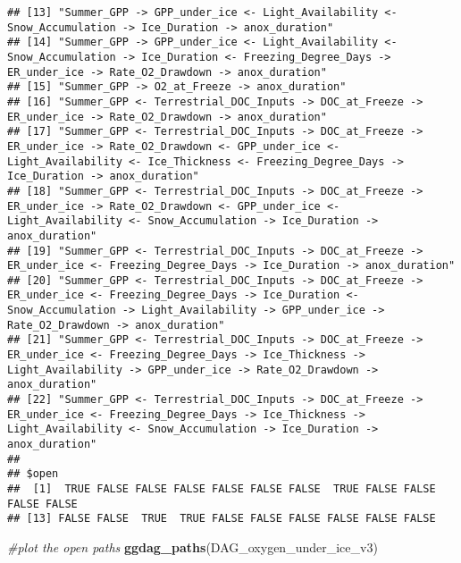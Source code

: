 \documentclass[
]{article}
\newenvironment{Shaded}{\begin{snugshade}}{\end{snugshade}}
\newcommand{\CommentTok}[1]{\textcolor[rgb]{0.56,0.35,0.01}{\textit{#1}}}
\newcommand{\FunctionTok}[1]{\textcolor[rgb]{0.13,0.29,0.53}{\textbf{#1}}}
\newcommand{\NormalTok}[1]{#1}
\begin{document}
\begin{verbatim}
## [13] "Summer_GPP -> GPP_under_ice <- Light_Availability <- Snow_Accumulation -> Ice_Duration -> anox_duration"                                                                                                       
## [14] "Summer_GPP -> GPP_under_ice <- Light_Availability <- Snow_Accumulation -> Ice_Duration <- Freezing_Degree_Days -> ER_under_ice -> Rate_O2_Drawdown -> anox_duration"                                           
## [15] "Summer_GPP -> O2_at_Freeze -> anox_duration"                                                                                                                                                                   
## [16] "Summer_GPP <- Terrestrial_DOC_Inputs -> DOC_at_Freeze -> ER_under_ice -> Rate_O2_Drawdown -> anox_duration"                                                                                                    
## [17] "Summer_GPP <- Terrestrial_DOC_Inputs -> DOC_at_Freeze -> ER_under_ice -> Rate_O2_Drawdown <- GPP_under_ice <- Light_Availability <- Ice_Thickness <- Freezing_Degree_Days -> Ice_Duration -> anox_duration"    
## [18] "Summer_GPP <- Terrestrial_DOC_Inputs -> DOC_at_Freeze -> ER_under_ice -> Rate_O2_Drawdown <- GPP_under_ice <- Light_Availability <- Snow_Accumulation -> Ice_Duration -> anox_duration"                        
## [19] "Summer_GPP <- Terrestrial_DOC_Inputs -> DOC_at_Freeze -> ER_under_ice <- Freezing_Degree_Days -> Ice_Duration -> anox_duration"                                                                                
## [20] "Summer_GPP <- Terrestrial_DOC_Inputs -> DOC_at_Freeze -> ER_under_ice <- Freezing_Degree_Days -> Ice_Duration <- Snow_Accumulation -> Light_Availability -> GPP_under_ice -> Rate_O2_Drawdown -> anox_duration"
## [21] "Summer_GPP <- Terrestrial_DOC_Inputs -> DOC_at_Freeze -> ER_under_ice <- Freezing_Degree_Days -> Ice_Thickness -> Light_Availability -> GPP_under_ice -> Rate_O2_Drawdown -> anox_duration"                    
## [22] "Summer_GPP <- Terrestrial_DOC_Inputs -> DOC_at_Freeze -> ER_under_ice <- Freezing_Degree_Days -> Ice_Thickness -> Light_Availability <- Snow_Accumulation -> Ice_Duration -> anox_duration"                    
## 
## $open
##  [1]  TRUE FALSE FALSE FALSE FALSE FALSE FALSE  TRUE FALSE FALSE FALSE FALSE
## [13] FALSE FALSE  TRUE  TRUE FALSE FALSE FALSE FALSE FALSE FALSE
\end{verbatim}

\begin{Shaded}
\begin{Highlighting}[]
\CommentTok{\#plot the open  paths }
\FunctionTok{ggdag\_paths}\NormalTok{(DAG\_oxygen\_under\_ice\_v3)}
\end{Highlighting}
\end{Shaded}
\end{document}
